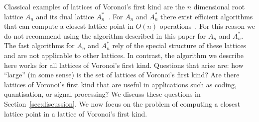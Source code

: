 \documentclass[final,leqno]{siamltex}
\begin{document}





Classical examples of lattices of Voronoi's first kind are the $n$ dimensional root lattice $A_n$ and its dual lattice $A_n^*$~\cite{SPLAG}.  %
For $A_n$ and $A_n^*$ there exist efficient algorithms that can compute a closest lattice point in $O(n)$ operations~\cite{McKilliam2009CoxeterLattices,Conway1982FastQuantDec}. For this reason we do not recommend using the algorithm described in this paper for $A_n$ and $A_n^*$.  
The fast algorithms for $A_n$ and $A_n^*$ rely of the special structure of these lattices and are not applicable to other lattices.  In contrast, the algorithm we describe here works for all lattices of Voronoi's first kind.  Questions that arise are: how ``large'' (in some sense) is the set of lattices of Voronoi's first kind?  Are there lattices of Voronoi's first kind that are useful in applications such as coding, quantisation, or signal processing?  We discuss these questions in Section~\ref{sec:discussion}.  We now focus on the problem of computing a closest lattice point in a lattice of Voronoi's first kind. 
\end{document}

